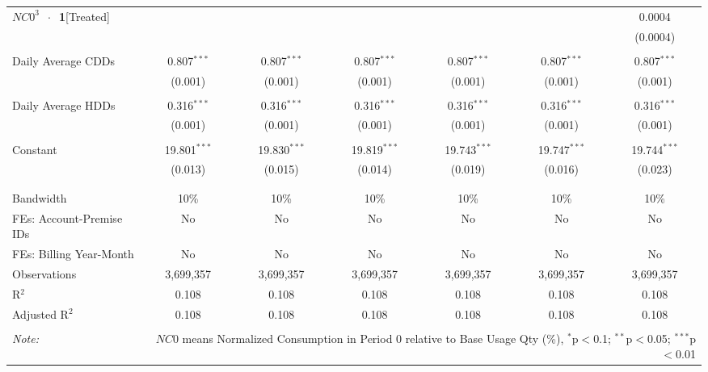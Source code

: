 \begin{table}[!htbp]
\begin{adjustbox}{scale = 0.8}
\begin{tabular}{@{\extracolsep{25pt}}lcccccc}
 $NC0^{3}$ $\ \cdot \ $ \textbf{1}[Treated] &  &  &  &  &  & 0.0004 \\ 
  &  &  &  &  &  & (0.0004) \\ 
  & & & & & & \\ 
 Daily Average CDDs & 0.807$^{***}$ & 0.807$^{***}$ & 0.807$^{***}$ & 0.807$^{***}$ & 0.807$^{***}$ & 0.807$^{***}$ \\ 
  & (0.001) & (0.001) & (0.001) & (0.001) & (0.001) & (0.001) \\ 
  & & & & & & \\ 
 Daily Average HDDs & 0.316$^{***}$ & 0.316$^{***}$ & 0.316$^{***}$ & 0.316$^{***}$ & 0.316$^{***}$ & 0.316$^{***}$ \\ 
  & (0.001) & (0.001) & (0.001) & (0.001) & (0.001) & (0.001) \\ 
  & & & & & & \\ 
 Constant & 19.801$^{***}$ & 19.830$^{***}$ & 19.819$^{***}$ & 19.743$^{***}$ & 19.747$^{***}$ & 19.744$^{***}$ \\ 
  & (0.013) & (0.015) & (0.014) & (0.019) & (0.016) & (0.023) \\ 
  & & & & & & \\ 
\hline \\[-1.8ex] 
Bandwidth & 10\% & 10\% & 10\% & 10\% & 10\% & 10\% \\ 
FEs: Account-Premise IDs & No & No & No & No & No & No \\ 
FEs: Billing Year-Month & No & No & No & No & No & No \\ 
Observations & 3,699,357 & 3,699,357 & 3,699,357 & 3,699,357 & 3,699,357 & 3,699,357 \\ 
R$^{2}$ & 0.108 & 0.108 & 0.108 & 0.108 & 0.108 & 0.108 \\ 
Adjusted R$^{2}$ & 0.108 & 0.108 & 0.108 & 0.108 & 0.108 & 0.108 \\ 
\hline 
\hline \\[-1.8ex] 
\textit{Note:}  & \multicolumn{6}{r}{$NC0$ means Normalized Consumption in Period 0 relative to Base Usage Qty (\%), $^{*}$p$<$0.1; $^{**}$p$<$0.05; $^{***}$p$<$0.01} \\ 
\end{tabular} 
\end{adjustbox}
\end{table} 
